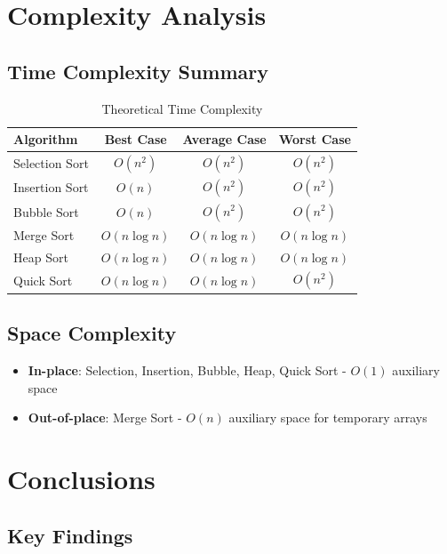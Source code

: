 \documentclass[12pt,a4paper]{article}
\begin{document}
\section{Complexity Analysis}

\subsection{Time Complexity Summary}

\begin{table}[H]
\centering
\caption{Theoretical Time Complexity}
\begin{tabular}{@{}lccc@{}}
\toprule
\textbf{Algorithm} & \textbf{Best Case} & \textbf{Average Case} & \textbf{Worst Case} \\
\midrule
Selection Sort & $O(n^2)$ & $O(n^2)$ & $O(n^2)$ \\
Insertion Sort & $O(n)$ & $O(n^2)$ & $O(n^2)$ \\
Bubble Sort & $O(n)$ & $O(n^2)$ & $O(n^2)$ \\
Merge Sort & $O(n \log n)$ & $O(n \log n)$ & $O(n \log n)$ \\
Heap Sort & $O(n \log n)$ & $O(n \log n)$ & $O(n \log n)$ \\
Quick Sort & $O(n \log n)$ & $O(n \log n)$ & $O(n^2)$ \\
\bottomrule
\end{tabular}
\end{table}

\subsection{Space Complexity}

\begin{itemize}
    \item \textbf{In-place}: Selection, Insertion, Bubble, Heap, Quick Sort - $O(1)$ auxiliary space
    \item \textbf{Out-of-place}: Merge Sort - $O(n)$ auxiliary space for temporary arrays
\end{itemize}

\section{Conclusions}

\subsection{Key Findings}
\end{document}
